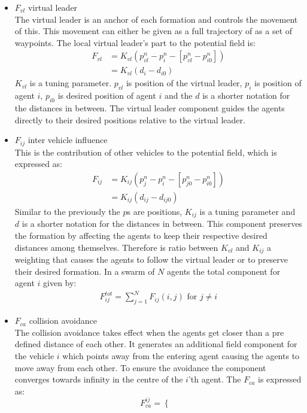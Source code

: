 \begin{itemize}
\item $F_{vl}$ virtual leader\\
The virtual leader is an anchor of each formation and controls the movement of this. This movement can either be given as a full trajectory of as a set of waypoints. The local virtual leader's part to the potential field is:
\begin{align}
F_{vl} &= K_{vl}(p_{vl}^n-p_i^n-[p_{vl}^n-p_{i0}^n])\\
&= K_{vl}(d_i-d_{i0})
\end{align}
$K_{vl}$ is a tuning parameter. $p_{vl}$ is position of the virtual leader, $p_i$ is position of agent $i$, $p_{i0}$ is desired position of agent $i$ and the $d$ is a shorter notation for the distances in between. The virtual leader component guides the agents directly to their desired positions relative to the virtual leader.
\item $F_{ij}$ inter vehicle influence\\
This is the contribution of other vehicles to the potential field, which is expressed as:
\begin{align}
F_{ij} &= K_{ij}(p_{j}^n-p_i^n-[p_{j0}^n-p_{i0}^n])\\
&= K_{ij}(d_{ij}-d_{ij0})
\end{align}
Similar to the previously the $p$s are positions, $K_{ij}$ is a tuning parameter and $d$ is a shorter notation for the distances in between. This component preserves the formation by affecting the agents to keep their respective desired distances among themselves. Therefore is ratio between $K_{vl}$ and $K_{ij}$ a weighting that causes the agents to follow the virtual leader or to preserve their desired formation. In a swarm of $N$ agents the total component for agent $i$ given by:
\begin{align}
F_{ij}^{tot} = \sum\limits_{j=1}^NF_{ij}(i,j) \text{ for } j\neq i
\end{align}
\item $F_{ca}$ collision avoidance\\
The collision avoidance takes effect when the agents get closer than a pre defined distance of each other. It generates an additional field component for the vehicle $i$ which points away from the entering agent causing the agents to move away from each other. To ensure the avoidance the component converges towards infinity in the centre of the $i$'th agent. The $F_{ca}$ is expressed as:
\[
    F_{ca}^{ij}= 
\begin{cases}

\end{cases}\]
\end{itemize}
